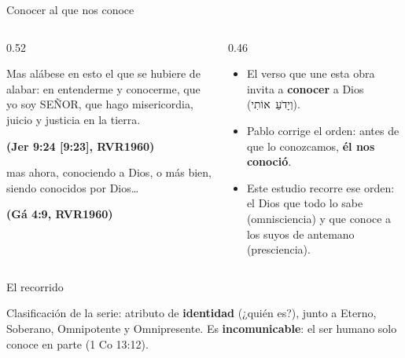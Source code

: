 \documentclass[hyperref={bookmarks=false},aspectratio=169]{beamer}
\newcommand{\heb}[1]{\mbox{\foreignlanguage{hebrew}{#1}}}
\newcommand{\SENOR}{S{\fontsize{0.78em}{1em}\selectfont EÑOR}}
\newcommand{\fuente}[1]{\par\hfill{\upshape\bfseries\footnotesize\textcolor{azul}{#1}}}
\newcommand{\destacar}[1]{\textbf{\textcolor{azul}{#1}}}
\begin{document}
\begin{frame}{Conocer al que nos conoce}
\begin{columns}[t,onlytextwidth]
\begin{column}{0.52\textwidth}
\begin{cita}Mas alábese en esto el que se hubiere de alabar: en entenderme y conocerme, que yo soy \SENOR{}, que hago misericordia, juicio y justicia en la tierra.\fuente{(Jer 9:24 [9:23], RVR1960)}\end{cita}
\begin{cita}mas ahora, conociendo a Dios, o más bien, siendo conocidos por Dios\ldots\fuente{(Gá 4:9, RVR1960)}\end{cita}
\end{column}
\begin{column}{0.46\textwidth}\small
\begin{itemize}
\item El verso que une esta obra invita a \destacar{conocer} a Dios (\heb{וְיָדֹעַ אוֹתִי}).
\item Pablo corrige el orden: antes de que lo conozcamos, \destacar{él nos conoció}.
\item Este estudio recorre ese orden: el Dios que todo lo sabe (omnisciencia) y que conoce a los suyos de antemano (presciencia).
\end{itemize}
\end{column}
\end{columns}
\end{frame}

\begin{frame}{El recorrido}
\centering
{}\par\medskip
\small\RaggedRight Clasificación de la serie: atributo de \destacar{identidad} (¿quién es?), junto a Eterno, Soberano, Omnipotente y Omnipresente. Es \destacar{incomunicable}: el ser humano solo conoce en parte (1 Co 13:12).
\end{frame}
\end{document}
